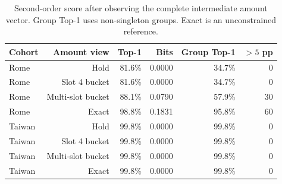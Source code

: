 \begin{table}[t]
\centering
\scriptsize
\setlength{\tabcolsep}{4pt}
\begin{tabular}{@{}lrrrrr@{}}
\toprule
Cohort & Amount view & Top-1 & Bits & Group Top-1 & $>5$ pp \\
\midrule
Rome & Hold & 81.6\% & 0.0000 & 34.7\% & 0 \\
Rome & Slot 4 bucket & 81.6\% & 0.0000 & 34.7\% & 0 \\
Rome & Multi-slot bucket & 88.1\% & 0.0790 & 57.9\% & 30 \\
Rome & Exact & 98.8\% & 0.1831 & 95.8\% & 60 \\
\midrule
Taiwan & Hold & 99.8\% & 0.0000 & 99.8\% & 0 \\
Taiwan & Slot 4 bucket & 99.8\% & 0.0000 & 99.8\% & 0 \\
Taiwan & Multi-slot bucket & 99.8\% & 0.0000 & 99.8\% & 0 \\
Taiwan & Exact & 99.8\% & 0.0000 & 99.8\% & 0 \\
\bottomrule
\end{tabular}

\caption{Second-order score after observing the complete intermediate amount vector. Group Top-1 uses non-singleton groups. Exact is an unconstrained reference.}
\label{tab:privacy}
\end{table}
